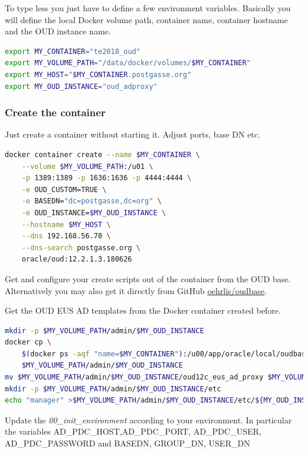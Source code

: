 \documentclass[a4paper,,tablecaptionabove]{scrartcl}
\begin{document}
To type less you just have to define a few environment variables.
Basically you will define the local Docker volume path, container name,
container hostname and the OUD instance name.

\begin{lstlisting}[language=bash]
export MY_CONTAINER="te2018_oud"
export MY_VOLUME_PATH="/data/docker/volumes/$MY_CONTAINER"
export MY_HOST="$MY_CONTAINER.postgasse.org"
export MY_OUD_INSTANCE="oud_adproxy"
\end{lstlisting}

\hypertarget{create-the-container}{%
\subsubsection{Create the container}\label{create-the-container}}

Just create a container without starting it. Adjust ports, base DN etc.

\begin{lstlisting}[language=bash]
docker container create --name $MY_CONTAINER \
    --volume $MY_VOLUME_PATH:/u01 \
    -p 1389:1389 -p 1636:1636 -p 4444:4444 \
    -e OUD_CUSTOM=TRUE \
    -e BASEDN="dc=postgasse,dc=org" \
    -e OUD_INSTANCE=$MY_OUD_INSTANCE \
    --hostname $MY_HOST \
    --dns 192.168.56.70 \
    --dns-search postgasse.org \
    oracle/oud:12.2.1.3.180626
\end{lstlisting}

Get and configure your create scripts out of the container from the OUD
base. Alternatively you may also get it directly from GitHub
\href{https://github.com/oehrlis/oudbase}{oehrlis/oudbase}.

Get the OUD EUS AD templates from the Docker container created before.

\begin{lstlisting}[language=bash]
mkdir -p $MY_VOLUME_PATH/admin/$MY_OUD_INSTANCE
docker cp \
    $(docker ps -aqf "name=$MY_CONTAINER"):/u00/app/oracle/local/oudbase/templates/create/oud12c_eus_ad_proxy \
    $MY_VOLUME_PATH/admin/$MY_OUD_INSTANCE
mv $MY_VOLUME_PATH/admin/$MY_OUD_INSTANCE/oud12c_eus_ad_proxy $MY_VOLUME_PATH/admin/$MY_OUD_INSTANCE/create
mkdir -p $MY_VOLUME_PATH/admin/$MY_OUD_INSTANCE/etc
echo "manager" >$MY_VOLUME_PATH/admin/$MY_OUD_INSTANCE/etc/${MY_OUD_INSTANCE}_pwd.txt
\end{lstlisting}

Update the \emph{00\_init\_environment} according to your environment.
In particular the variables AD\_PDC\_HOST,AD\_PDC\_PORT, AD\_PDC\_USER,
AD\_PDC\_PASSWORD and BASEDN, GROUP\_DN, USER\_DN
\end{document}
